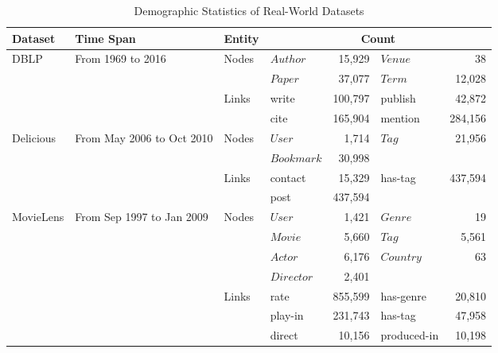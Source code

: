 \begin{table}[t]
	\centering
	\caption{Demographic Statistics of Real-World Datasets}
	\label{table:dataset}
	\footnotesize
	\begin{tabular} {l l l l r l r}
		\toprule
		Dataset & Time Span & Entity & \multicolumn{4}{c}{Count}\\
		\midrule %
		\multirow{4}{*}{DBLP} & \multirow{4}{*}{From 1969 to 2016}
		& \multirow{2}{*}{Nodes}
		& $Author$ & 15,929 & $Venue$ & 38 \\ %
		& & & $Paper$ & 37,077 & $Term$ & 12,028 \\ %
		\cmidrule{3-7}
		& & \multirow{2}{*}{Links}
		& write & 100,797 & publish & 42,872 \\ %
		& & & cite & 165,904 & mention & 284,156 \\ %
		
		\midrule %
		\multirow{4}{*}{Delicious} & \multirow{4}{*}{From May 2006 to Oct 2010}
		& \multirow{2}{*}{Nodes}
		& $User$ & 1,714 & $Tag$ & 21,956 \\ %
		& & & $Bookmark$ & 30,998 & & \\ %
		\cmidrule{3-7}
		& & \multirow{2}{*}{Links}
		& contact & 15,329 & has-tag & 437,594 \\ %
		& & & post & 437,594 & & \\ %
		
		\midrule %
		\multirow{7}{*}{MovieLens} & \multirow{7}{*}{From Sep 1997 to Jan 2009}
		& \multirow{4}{*}{Nodes}
		& $User$ & 1,421 & $Genre$ & 19 \\ %
		& & & $Movie$ & 5,660 & $Tag$ & 5,561 \\ %
		& & & $Actor$ & 6,176 & $Country$ & 63 \\ %
		& & & $Director$ & 2,401 & & \\ %
		\cmidrule{3-7}
		& & \multirow{3}{*}{Links}
		& rate & 855,599 & has-genre & 20,810 \\ %
		& & & play-in & 231,743 & has-tag & 47,958 \\ %
		& & & direct & 10,156 & produced-in & 10,198 \\ %
		\bottomrule %
	\end{tabular}
\end{table}

